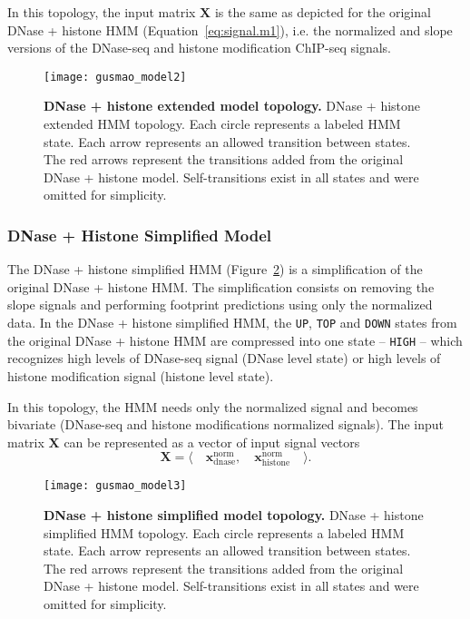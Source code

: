 In this topology, the input matrix $\mathbf{X}$ is the same as depicted for the original DNase + histone HMM (Equation~\ref{eq:signal.m1}), i.e. the normalized and slope versions of the DNase-seq and histone modification ChIP-seq signals.

\begin{figure}[h!]
\centering
\texttt{[image: gusmao\_model2]}
\caption[DNase + histone extended model topology]{\textbf{DNase + histone extended model topology.} DNase + histone extended HMM topology. Each circle represents a labeled HMM state. Each arrow represents an allowed transition between states. The red arrows represent the transitions added from the original DNase + histone model. Self-transitions exist in all states and were omitted for simplicity.}
\label{fig:gusmao_model2}
\end{figure}

\subsubsection{DNase + Histone Simplified Model}

The DNase + histone simplified HMM (Figure~\ref{fig:gusmao_model3}) is a simplification of the original DNase + histone HMM. The simplification consists on removing the slope signals and performing footprint predictions using only the normalized data. In the DNase + histone simplified HMM, the {\tt UP}, {\tt TOP} and {\tt DOWN} states from the original DNase + histone HMM are compressed into one state -- {\tt HIGH} -- which recognizes high levels of DNase-seq signal (DNase level state) or high levels of histone modification signal (histone level state).

In this topology, the HMM needs only the normalized signal and becomes bivariate (DNase-seq and histone modifications normalized signals). The input matrix $\mathbf{X}$ can be represented as a vector of input signal vectors
\begin{equation}
  \label{eq:signal.m3}
  \mathbf{X} = \langle \quad \mathbf{x}^{\text{norm}}_{\text{dnase}} ,\quad \mathbf{x}^{\text{norm}}_{\text{histone}} \quad \rangle .
\end{equation}

\begin{figure}[h!]
\centering
\texttt{[image: gusmao\_model3]}
\caption[DNase + histone simplified model topology]{\textbf{DNase + histone simplified model topology.} DNase + histone simplified HMM topology. Each circle represents a labeled HMM state. Each arrow represents an allowed transition between states. The red arrows represent the transitions added from the original DNase + histone model. Self-transitions exist in all states and were omitted for simplicity.}
\label{fig:gusmao_model3}
\end{figure}

